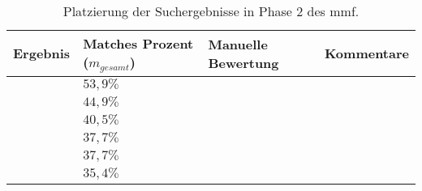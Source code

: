 \begin{table}[!h]
  \centering
  \begin{tabular}{m{2cm} m{4.3cm} m{4.3cm} m{2.5cm}}
    \toprule
    \textbf{Ergebnis} & \textbf{Matches Prozent ($m_{gesamt}$)} & \textbf{Manuelle Bewertung} & \textbf{Kommentare} \\ \midrule
    \cite{arh-result-no-filter-1} & $53,9\%$ & & \\ \hline
    \cite{arh-result-no-filter-3} & $44,9\%$& & \\ \hline
    \cite{arh-result-no-filter-2} & $40,5\%$& & \\ \hline
    \cite{arh-result-no-filter-4} & $37,7\%$& & \\ \hline
    \cite{arh-result-no-filter-5} & $37,7\%$& & \\ \hline
    \cite{arh-result-important-filter-4} & $35,4\%$& & \\
    \bottomrule
  \end{tabular}
  \caption[Platzierung der Suchergebnisse in Phase 2 des \gls{mmf}]{
   	Platzierung der Suchergebnisse in Phase 2 des \gls{mmf}.
  }
  \label{tab:phase2-ranking}
\end{table}
